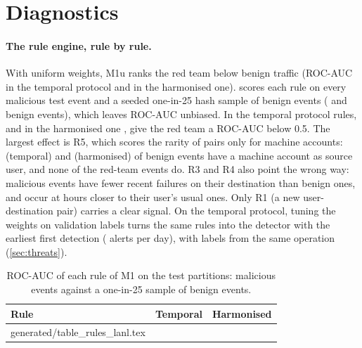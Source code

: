 \documentclass[11pt,a4paper]{article}
\makeatletter
\newcommand{\tablerows}[1]{\@@input #1 }
\makeatother
\begin{document}
\section{Diagnostics}
\label{sec:diagnostics}

\paragraph{The rule engine, rule by rule.} With uniform weights, M1u ranks the red team below benign traffic (ROC-AUC \TempRulesUniformRocAuc{} in the temporal protocol and \HarmRulesUniformRocAuc{} in the harmonised one).  scores each rule on every malicious test event and a seeded one-in-25 hash sample of benign events (\TempRuleSampleBenign{} and \HarmRuleSampleBenign{} benign events), which leaves ROC-AUC unbiased. In the temporal protocol \TempRulesBelowChance{} rules, and in the harmonised one \HarmRulesBelowChance{}, give the red team a ROC-AUC below 0.5. The largest effect is R5, which scores the rarity of pairs only for machine accounts: \TempMachineBenignShare{} (temporal) and \HarmMachineBenignShare{} (harmonised) of benign events have a machine account as source user, and none of the red-team events do. R3 and R4 also point the wrong way: malicious events have fewer recent failures on their destination than benign ones, and occur at hours closer to their user's usual ones. Only R1 (a new user-destination pair) carries a clear signal. On the temporal protocol, tuning the weights on validation labels turns the same rules into the detector with the earliest first detection (\TempRulesFirstDetection{} alerts per day), with labels from the same operation (\cref{sec:threats}).

\begin{table}[t]
\centering
\small
\begin{threeparttable}
\caption{ROC-AUC of each rule of M1 on the test partitions: malicious events against a one-in-25 sample of benign events.}
\label{tab:rules-lanl}
\begin{tabular}{@{}lrr@{}}
\toprule
Rule & Temporal & Harmonised \\
\midrule
\tablerows{generated/table_rules_lanl.tex}
\bottomrule
\end{tabular}
\end{threeparttable}
\end{table}
\end{document}

